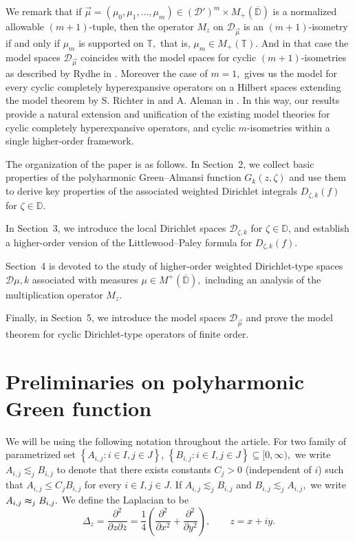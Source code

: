 \documentclass[10pt,oneside,reqno]{amsart}
\theoremstyle{definition}
\theoremstyle{remark}
\newcommand{\D}{\mathbb D}
\newcommand{\T}{\mathbb T}
\numberwithin{equation}{section}
\begin{document}
We remark that if $\overrightarrow{\mu}= (\mu_0,\mu_1,\ldots,\mu_{m})\in (\mathcal D')^{m}\times M_+(\overline{\D})$ is a normalized allowable $(m+1)$-tuple, then the operator $M_z$ on  $\mathscr D_{\overrightarrow{\mu}}$ is an $(m+1)$-isometry if and only if $\mu_m$ is supported on $\T,$ that is, $\mu_m\in M_+(\T).$ And in that case the model spaces $\mathscr D_{\overrightarrow{\mu}}$ coincides with the model spaces for cyclic $(m+1)$-isometries as described by Rydhe in \cite[Theorem 3.1]{Rydhe19}. Moreover the case of $m=1,$ gives us the model for every cyclic completely hyperexpansive operators on a Hilbert spaces extending the model theorem by S. Richter in \cite[Theorem 5.1]{Richter91} and A. Aleman in \cite[IV, Theorem 2.5]{1993multiplication}. In this way, our results provide a natural extension and unification of the existing model theories for cyclic completely hyperexpansive operators, and cyclic $m$-isometries within a single higher-order framework.

The organization of the paper is as follows. In Section~2, we collect basic properties of the polyharmonic Green–Almansi function $G_k(z,\zeta)$ and use them to derive key properties of the associated weighted Dirichlet integrals $D_{\zeta,k}(f)$ for $\zeta \in \mathbb{D}.$

In Section~3, we introduce the local Dirichlet spaces $\mathscr D_{\zeta,k}$ for $\zeta \in \mathbb{D}$, and establish a higher-order version of the Littlewood–Paley formula for $D_{\zeta,k}(f).$

Section~4 is devoted to the study of higher-order weighted Dirichlet-type spaces $\mathscr{D}{\mu,k}$ associated with measures $\mu \in M^+(\overline{\mathbb{D}}),$ including an analysis of the multiplication operator $M_z.$

Finally, in Section~5, we introduce the model spaces $\mathscr{D}_{\overrightarrow{\mu}}$ and prove the model theorem for cyclic Dirichlet-type operators of finite order.

\section{Preliminaries on polyharmonic Green function}
We will be using the following notation throughout the article. For two family of parametrized set $\left\{A_{i,j}: i\in I,j\in J\right\}$, $
\left \{B_{i,j}: i\in I,j\in J\right \} \subseteq [0,\infty),$ we write $A_{i,j} \lesssim_{j} B_{i,j}$ to denote that there exists constants $C_j >0$ (independent of $i$) such that $A_{i,j} \leqslant C_j B_{i,j}$ for every $i\in I,j\in J.$ If $A_{i,j} \lesssim_{j} B_{i,j}$ and $B_{i,j} \lesssim_{j} A_{i,j},$ we write $A_{i,j} \thickapprox_{j} B_{i,j}.$ We define the Laplacian to be 
\begin{equation*}
    \Delta_{z} = \frac{\partial^2}{\partial z \partial \overline{z}} = \frac{1}{4} \left( \frac{\partial ^{2}}{\partial x^{2}} + \frac{\partial ^{2}}{\partial y^{2}} \right), \qquad  z=x+iy.
\end{equation*}
\end{document}
